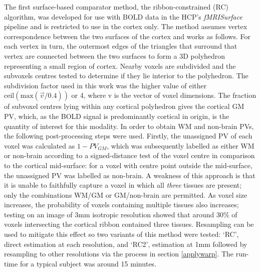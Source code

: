 The first surface-based comparator method, the ribbon-constrained (RC) algorithm, was developed for use with BOLD data in the HCP’s \textit{fMRISurface} pipeline \cite{Glasser2013} and is restricted to use in the cortex only. The method assumes vertex correspondence between the two surfaces of the cortex and works as follows. For each vertex in turn, the outermost edges of the triangles that surround that vertex are connected between the two surfaces to form a 3D polyhedron representing a small region of cortex. Nearby voxels are subdivided and the subvoxels centres tested to determine if they lie interior to the polyhedron. The subdivision factor used in this work was the higher value of either $\mathrm{ceil}( \mathrm{max} (\vec{v}/0.4) )$ or 4, where v is the vector of voxel dimensions. The fraction of subvoxel centres lying within any cortical polyhedron gives the cortical GM PV, which, as the BOLD signal is predominantly cortical in origin, is the quantity of interest for this modality. In order to obtain WM and non-brain PVs, the following post-processing steps were used. Firstly, the unassigned PV of each voxel was calculated as $1-PV_{GM}$, which was subsequently labelled as either WM or non-brain according to a signed-distance test of the voxel centre in comparison to the cortical mid-surface: for a voxel with centre point outside the mid-surface, the unassigned PV was labelled as non-brain. A weakness of this approach is that it is unable to faithfully capture a voxel in which all \textit{three} tissues are present; only the combinations WM/GM or GM/non-brain are permitted. As voxel size increases, the probability of voxels containing multiple tissues also increases; testing on an image of 3mm isotropic resolution showed that around 30\% of voxels intersecting the cortical ribbon contained three tissues. Resampling can be used to mitigate this effect so two variants of this method were tested: ‘RC’, direct estimation at each resolution, and ‘RC2’, estimation at 1mm followed by resampling to other resolutions via the process in section \ref{applywarp}. The run-time for a typical subject was around 15 minutes. 


